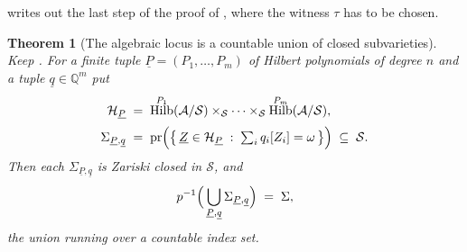 \documentclass[11pt,reqno]{amsart}
\theoremstyle{plain}
\newtheorem{theorem}{Theorem}[section]
\theoremstyle{definition}
\theoremstyle{remark}
\newcommand{\QQ}{\mathbb{Q}}
\newcommand{\cH}{\mathcal{H}}
\newcommand{\cA}{\mathcal{A}}
\newcommand{\cS}{\mathcal{S}}
\DeclareMathOperator{\Hilb}{Hilb}
\begin{document}
 writes out the last step of the proof of
, where the witness $\tau$ has to be chosen.

\begin{theorem}[The algebraic locus is a countable union of closed
subvarieties]\label{thm:closedlocus}
Keep . For a finite tuple $\underline{P}=(P_{1},\dots
,P_{m})$ of Hilbert polynomials of degree $n$ and a tuple
$\underline{q}\in\QQ^{m}$ put
\begin{align*}
  \cH_{\underline{P}}
  &\;=\;
  \Hilb^{P_{1}}(\cA/\cS)\times_{\cS}\cdots\times_{\cS}\Hilb^{P_{m}}(\cA/\cS),
  \\[2pt]
  \Sigma_{\underline{P},\underline{q}}
  &\;=\;
  \mathrm{pr}\Bigl(\bigl\{\,\underline{Z}\in\cH_{\underline{P}}
    \;:\;\textstyle\sum_{i}q_{i}[Z_{i}]=\omega\,\bigr\}\Bigr)
  \;\subseteq\;\cS .
\end{align*}
Then each $\Sigma_{\underline{P},\underline{q}}$ is Zariski closed in
$\cS$, and
\[
  p^{-1}\Bigl(\,\bigcup_{\underline{P},\underline{q}}
    \Sigma_{\underline{P},\underline{q}}\Bigr)\;=\;\Sigma ,
\]
the union running over a countable index set.
\end{theorem}
\end{document}
